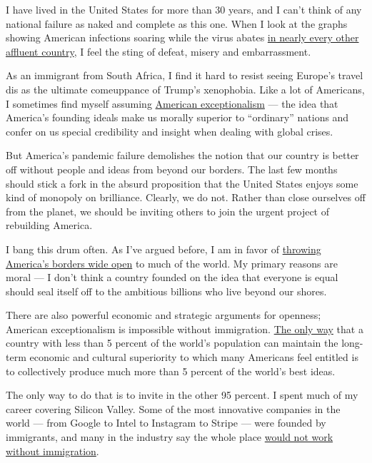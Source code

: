 I have lived in the United States for more than 30 years, and I can't
think of any national failure as naked and complete as this one. When I
look at the graphs showing American infections soaring while the virus
abates
\href{https://www.nytimes.com/2020/06/29/briefing/coronavirus-mississippi-new-england-patriots-your-monday-briefing.html}{in
nearly every other affluent country}, I feel the sting of defeat, misery
and embarrassment.

As an immigrant from South Africa, I find it hard to resist seeing
Europe's travel dis as the ultimate comeuppance of Trump's xenophobia.
Like a lot of Americans, I sometimes find myself assuming
\href{https://theweek.com/articles/654508/what-exactly-american-exceptionalism}{American
exceptionalism} --- the idea that America's founding ideals make us
morally superior to ``ordinary'' nations and confer on us special
credibility and insight when dealing with global crises.

But America's pandemic failure demolishes the notion that our country is
better off without people and ideas from beyond our borders. The last
few months should stick a fork in the absurd proposition that the United
States enjoys some kind of monopoly on brilliance. Clearly, we do not.
Rather than close ourselves off from the planet, we should be inviting
others to join the urgent project of rebuilding America.

I bang this drum often. As I've argued before, I am in favor of
\href{https://www.nytimes.com/2019/01/16/opinion/open-borders-immigration.html}{throwing
America's borders wide open} to much of the world. My primary reasons
are moral --- I don't think a country founded on the idea that everyone
is equal should seal itself off to the ambitious billions who live
beyond our shores.

There are also powerful economic and strategic arguments for openness;
American exceptionalism is impossible without immigration.
\href{http://paulgraham.com/95.html}{The only way} that a country with
less than 5 percent of the world's population can maintain the long-term
economic and cultural superiority to which many Americans feel entitled
is to collectively produce much more than 5 percent of the world's best
ideas.

The only way to do that is to invite in the other 95 percent. I spent
much of my career covering Silicon Valley. Some of the most innovative
companies in the world --- from Google to Intel to Instagram to Stripe
--- were founded by immigrants, and many in the industry say the whole
place
\href{https://www.nytimes.com/2017/02/08/technology/personaltech/why-silicon-valley-wouldnt-work-without-immigrants.html}{would
not work without immigration}.

